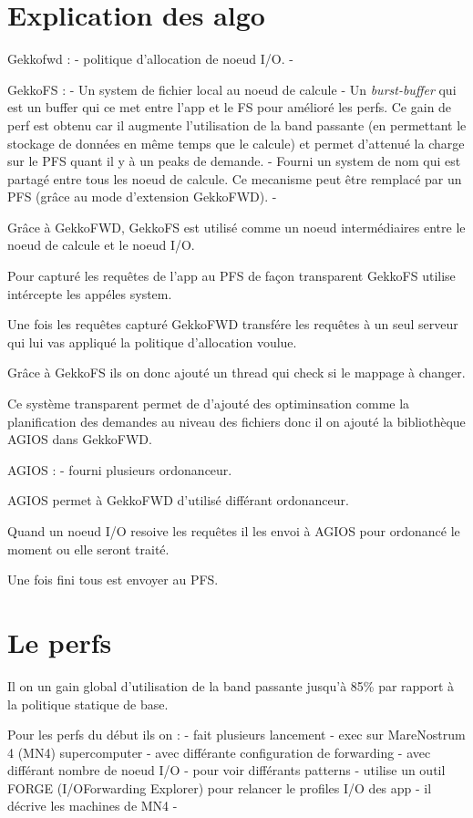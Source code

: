 \documentclass[10pt, a4paper]{article}
\begin{document}
\section{Explication des algo}
Gekkofwd :
- politique d'allocation de noeud I/O.
- 

GekkoFS :
- Un system de fichier local au noeud de calcule
- Un \emph{burst-buffer} qui est un buffer qui ce met entre l'app et le FS pour amélioré les perfs. Ce gain de perf est obtenu car il augmente l'utilisation de la band passante (en permettant le stockage de données en même temps que le calcule) et permet d'attenué la charge sur le PFS quant il y à un peaks de demande.
- Fourni un system de nom qui est partagé entre tous les noeud de calcule. Ce mecanisme peut être remplacé par un PFS (grâce au mode d'extension GekkoFWD).
- 

Grâce à GekkoFWD, GekkoFS est utilisé comme un noeud intermédiaires entre le noeud de calcule et le noeud I/O.

Pour capturé les requêtes de l'app au PFS de façon transparent GekkoFS utilise intércepte les appéles system.

Une fois les requêtes capturé GekkoFWD transfére les requêtes à un seul serveur qui lui vas appliqué la politique d'allocation voulue.

Grâce à GekkoFS ils on donc ajouté un thread qui check si le mappage à changer.

Ce système transparent permet de d'ajouté des optiminsation comme la planification des demandes au niveau des fichiers donc il on ajouté la bibliothèque AGIOS dans GekkoFWD.

AGIOS :
- fourni plusieurs ordonanceur.

AGIOS permet à GekkoFWD d'utilisé différant ordonanceur.

Quand un noeud I/O resoive les requêtes il les envoi à AGIOS pour ordonancé le moment ou elle seront traité.

Une fois fini tous est envoyer au PFS.

\section{Le perfs}

Il on un gain global d'utilisation de la band passante jusqu'à 85\% par rapport à la politique statique de base.

Pour les perfs du début ils on :
- fait plusieurs lancement
- exec sur MareNostrum 4 (MN4) supercomputer
- avec différante configuration de forwarding
- avec différant nombre de noeud I/O
- pour voir différants patterns
- utilise un outil FORGE (I/OForwarding Explorer) pour relancer le profiles I/O des app
- il décrive les machines de MN4
- 
\end{document}
